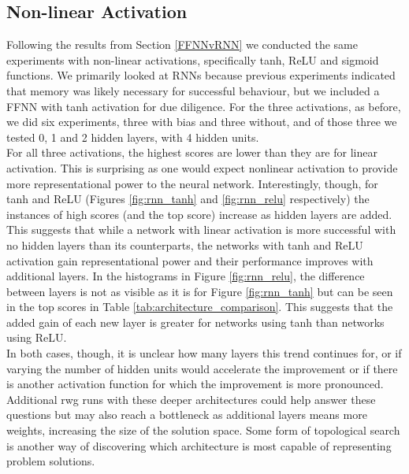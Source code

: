 \documentclass[12pt]{article}
\begin{document}
\subsection{Non-linear Activation}\label{non-linear}

Following the results from Section \ref{FFNNvRNN} we conducted the same experiments with non-linear activations, specifically tanh, ReLU and sigmoid functions. We primarily looked at RNNs because previous experiments indicated that memory was likely necessary for successful behaviour, but we included a FFNN with tanh activation for due diligence. For the three activations, as before, we did six experiments, three with bias and three without, and of those three we tested 0, 1 and 2 hidden layers, with 4 hidden units.\\

For all three activations, the highest scores are lower than they are for linear activation. This is surprising as one would expect nonlinear activation to provide more representational power to the neural network. Interestingly, though, for tanh and ReLU (Figures \ref{fig:rnn_tanh} and \ref{fig:rnn_relu} respectively) the instances of high scores (and the top score) increase as hidden layers are added. This suggests that while a network with linear activation is more successful with no hidden layers than its counterparts, the networks with tanh and ReLU activation gain representational power and their performance improves with additional layers. In the histograms in Figure \ref{fig:rnn_relu}, the difference between layers is not as visible as it is for Figure \ref{fig:rnn_tanh} but can be seen in the top scores in Table \ref{tab:architecture_comparison}. This suggests that the added gain of each new layer is greater for networks using tanh than networks using ReLU.\\

In both cases, though, it is unclear how many layers this trend continues for, or if varying the number of hidden units would accelerate the improvement or if there is another activation function for which the improvement is more pronounced. Additional rwg runs with these deeper architectures could help answer these questions but may also reach a bottleneck as additional layers means more weights, increasing the size of the solution space. Some form of topological search \cite{stanley:MIT:2002} is another way of discovering which architecture is most capable of representing problem solutions.\\ 
\end{document}
